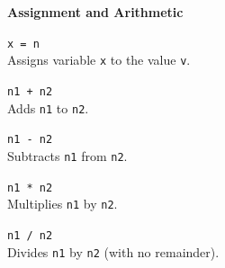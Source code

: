\documentclass[10pt,twocolumn]{article}
\begin{document}
\medskip

\balance

\noindent\textbf{\large Assignment and Arithmetic}
\begin{description}

\item{\texttt{x = n}} \ \\[.25em]
  Assigns variable \texttt{x} to the value \texttt{v}.

\item{\texttt{n1 + n2}} \ \\[.25em]
  Adds \texttt{n1} to \texttt{n2}. 

\item{\texttt{n1 - n2}} \ \\[.25em]
  Subtracts \texttt{n1} from \texttt{n2}. 

\item{\texttt{n1 * n2}} \ \\[.25em]
  Multiplies \texttt{n1} by \texttt{n2}. 

\item{\texttt{n1 / n2}} \ \\[.25em]
  Divides \texttt{n1} by \texttt{n2} (with no remainder).
\end{description}

\medskip
\end{document}
